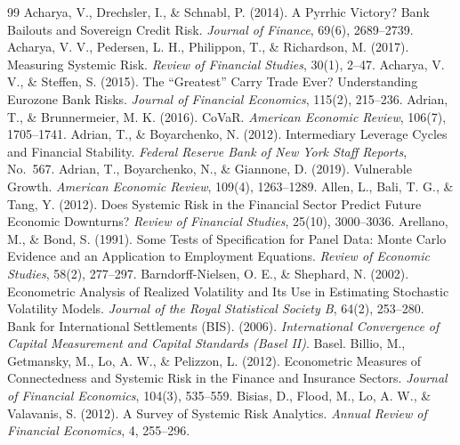 \begin{thebibliography}{99}
\sloppy\small
{} Acharya, V., Drechsler, I., \& Schnabl, P. (2014). A Pyrrhic Victory? Bank Bailouts and Sovereign Credit Risk. \textit{Journal of Finance}, 69(6), 2689--2739.
 Acharya, V. V., Pedersen, L. H., Philippon, T., \& Richardson, M. (2017). Measuring Systemic Risk. \textit{Review of Financial Studies}, 30(1), 2--47.
 Acharya, V. V., \& Steffen, S. (2015). The ``Greatest'' Carry Trade Ever? Understanding Eurozone Bank Risks. \textit{Journal of Financial Economics}, 115(2), 215--236.
 Adrian, T., \& Brunnermeier, M. K. (2016). CoVaR. \textit{American Economic Review}, 106(7), 1705--1741.
 Adrian, T., \& Boyarchenko, N. (2012). Intermediary Leverage Cycles and Financial Stability. \textit{Federal Reserve Bank of New York Staff Reports}, No.\ 567.
 Adrian, T., Boyarchenko, N., \& Giannone, D. (2019). Vulnerable Growth. \textit{American Economic Review}, 109(4), 1263--1289.
 Allen, L., Bali, T. G., \& Tang, Y. (2012). Does Systemic Risk in the Financial Sector Predict Future Economic Downturns? \textit{Review of Financial Studies}, 25(10), 3000--3036.
 Arellano, M., \& Bond, S. (1991). Some Tests of Specification for Panel Data: Monte Carlo Evidence and an Application to Employment Equations. \textit{Review of Economic Studies}, 58(2), 277--297.
 Barndorff-Nielsen, O. E., \& Shephard, N. (2002). Econometric Analysis of Realized Volatility and Its Use in Estimating Stochastic Volatility Models. \textit{Journal of the Royal Statistical Society B}, 64(2), 253--280.
 Bank for International Settlements (BIS). (2006). \textit{International Convergence of Capital Measurement and Capital Standards (Basel II)}. Basel.
 Billio, M., Getmansky, M., Lo, A. W., \& Pelizzon, L. (2012). Econometric Measures of Connectedness and Systemic Risk in the Finance and Insurance Sectors. \textit{Journal of Financial Economics}, 104(3), 535--559.
 Bisias, D., Flood, M., Lo, A. W., \& Valavanis, S. (2012). A Survey of Systemic Risk Analytics. \textit{Annual Review of Financial Economics}, 4, 255--296.

\end{thebibliography}
